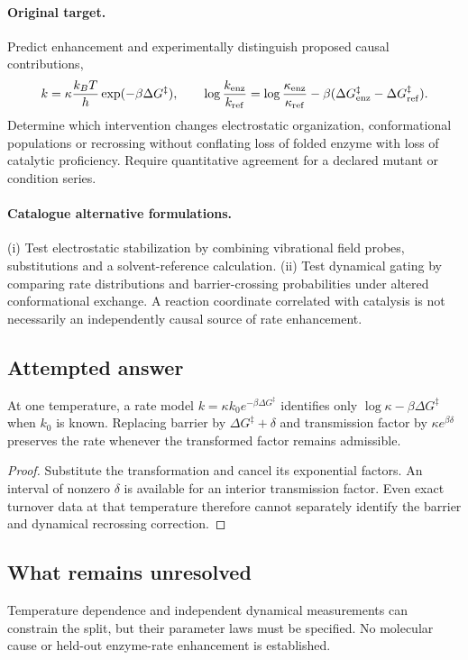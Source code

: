 \documentclass[11pt]{article}
\begin{document}
\paragraph{Original target.}
Predict enhancement and experimentally distinguish proposed causal contributions,
\[k=\kappa\frac{k_BT}{h}\exp(-\beta\Delta G^\ddagger),\qquad \log\frac{k_{\rm enz}}{k_{\rm ref}}=\log\frac{\kappa_{\rm enz}}{\kappa_{\rm ref}}-\beta(\Delta G^\ddagger_{\rm enz}-\Delta G^\ddagger_{\rm ref}).\]
Determine which intervention changes electrostatic organization, conformational populations or recrossing without conflating loss of folded enzyme with loss of catalytic proficiency. Require quantitative agreement for a declared mutant or condition series.
\paragraph{Catalogue alternative formulations.}
(i) Test electrostatic stabilization by combining vibrational field probes, substitutions and a solvent-reference calculation. (ii) Test dynamical gating by comparing rate distributions and barrier-crossing probabilities under altered conformational exchange. A reaction coordinate correlated with catalysis is not necessarily an independently causal source of rate enhancement.
\subsection{Attempted answer}
\begin{proposition}
At one temperature, a rate model $k=\kappa k_0e^{-\beta\Delta G^\ddagger}$ identifies only $\log\kappa-\beta\Delta G^\ddagger$ when $k_0$ is known. Replacing barrier by $\Delta G^\ddagger+\delta$ and transmission factor by $\kappa e^{\beta\delta}$ preserves the rate whenever the transformed factor remains admissible.
\end{proposition}
\begin{proof}
Substitute the transformation and cancel its exponential factors. An interval of nonzero $\delta$ is available for an interior transmission factor. Even exact turnover data at that temperature therefore cannot separately identify the barrier and dynamical recrossing correction.
\end{proof}
\subsection{What remains unresolved}
Temperature dependence and independent dynamical measurements can constrain the split, but their parameter laws must be specified. No molecular cause or held-out enzyme-rate enhancement is established.
\end{document}
